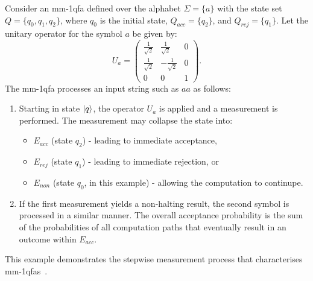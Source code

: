 \begin{example}
    Consider an \gls{mm-1qfa} defined over the alphabet $\Sigma=\{a\}$ with the state set $Q=\{q_0,q_1,q_2\}$, where $q_0$ is the initial state, $Q_{acc}=\{q_2\}$, and $Q_{rej}=\{q_1\}$. Let the unitary operator for the symbol $a$ be given by:
    \[
    U_a = \begin{pmatrix}
    \frac{1}{\sqrt{2}} & \frac{1}{\sqrt{2}} & 0 \\[1mm]
    \frac{1}{\sqrt{2}} & -\frac{1}{\sqrt{2}} & 0 \\[1mm]
    0 & 0 & 1
    \end{pmatrix}.
    \]
    The \gls{mm-1qfa} processes an input string such as $aa$ as follows:
    \begin{enumerate}
        \item Starting in state $\ket{q}$, the operator $U_a$ is applied and a measurement is performed. The measurement may collapse the state into:
        \begin{itemize}
            \item $E_{acc}$ (state $q_2$) - leading to immediate acceptance,
            \item $E_{rej}$ (state $q_1$) - leading to immediate rejection, or
            \item $E_{non}$ (state $q_0$, in this example) - allowing the computation to continupe.
        \end{itemize}
        \item If the first measurement yields a non-halting result, the second symbol is processed in a similar manner. The overall acceptance probability is the sum of the probabilities of all computation paths that eventually result in an outcome within $E_{acc}$.
    \end{enumerate}
    This example demonstrates the stepwise measurement process that characterises \glspl{mm-1qfa}~\cite{kondacs1997power,lin2012another}.
\end{example}